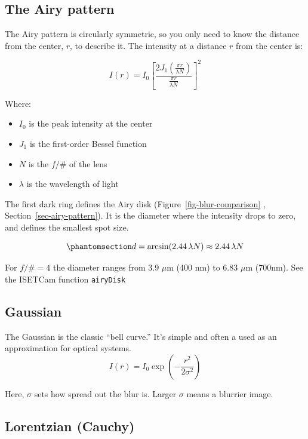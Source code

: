 \documentclass[
  letterpaper,
]{book}
\providecommand{\tightlist}{%
  \setlength{\itemsep}{0pt}\setlength{\parskip}{0pt}}\usepackage{longtable,booktabs,array}
\begin{document}
\subsection{The Airy pattern}\label{the-airy-pattern}

The Airy pattern is circularly symmetric, so you only need to know the
distance from the center, \(r\), to describe it. The intensity at a
distance \(r\) from the center is:

\[
I(r) = I_0 \left[ \frac{2 J_1\left( \frac{\pi r}{\lambda N} \right)}{ \frac{\pi r}{\lambda N} } \right]^2
\]

Where:

\begin{itemize}
\tightlist
\item
  \(I_0\) is the peak intensity at the center
\item
  \(J_1\) is the first-order Bessel function
\item
  \(N\) is the \(f/\#\) of the lens
\item
  \(\lambda\) is the wavelength of light
\end{itemize}

The first dark ring defines the Airy disk
(Figure~\ref{fig-blur-comparison} , Section~\ref{sec-airy-pattern}). It
is the diameter where the intensity drops to zero, and defines the
smallest spot size.

\begin{equation}\phantomsection\label{eq-airydisk3}{
d = \arcsin(2.44 \, \lambda N) \approx 2.44 \, \lambda N
}\end{equation}

For \(f/\# = 4\) the diameter ranges from 3.9 \(\mu\text{m}\) (400 nm)
to 6.83 \(\mu\text{m}\) (700nm). See the ISETCam function
\texttt{airyDisk}

\subsection{Gaussian}\label{gaussian}

The Gaussian is the classic ``bell curve.'' It's simple and often a used
as an approximation for optical systems. \[
I(r) = I_0 \exp\left( -\frac{r^2}{2\sigma^2} \right)
\]

Here, \(\sigma\) sets how spread out the blur is. Larger \(\sigma\)
means a blurrier image.

\subsection{Lorentzian (Cauchy)}\label{lorentzian-cauchy}
\end{document}
